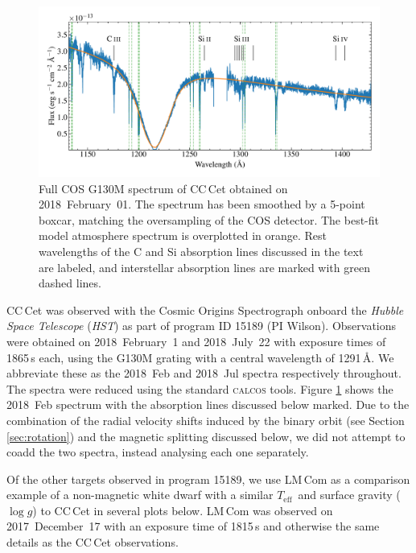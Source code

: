 \documentclass[fleqn,usenatbib]{mnras}
\newcommand{\Teff}{\mbox{$T_{\mathrm{eff}}$}}
\newcommand{\logg}{\mbox{$\log g$}}
\begin{document}
\begin{figure}
    \centering
    \includegraphics[width=2\columnwidth]{cc_cet_cos.pdf}
    \caption{Full COS G130M spectrum of CC\,Cet obtained on 2018~February~01. The spectrum has been smoothed by a 5-point boxcar, matching the 
    oversampling 
    of the COS detector. The best-fit model atmosphere spectrum is overplotted in orange. Rest wavelengths of the C and Si absorption lines discussed in the text are labeled, and interstellar absorption lines are marked with green dashed lines.}
    \label{fig:cos_spec}
\end{figure}

CC\,Cet was observed with the Cosmic Origins Spectrograph \citep[COS,][]{greenetal12-1} onboard the \textit{Hubble Space Telescope} (\textit{HST}) as part of program ID 15189 (PI Wilson). Observations were obtained on 2018~February~1 and 2018~July~22 with exposure times of 1865\,s each, using the G130M grating with a central wavelength of 1291\,\AA. We abbreviate these as the 2018~Feb and 2018~Jul spectra respectively throughout. The spectra were reduced using the standard \textsc{calcos} tools. Figure \ref{fig:cos_spec} shows the 2018~Feb spectrum with the absorption lines discussed below marked. Due to the combination of the radial velocity shifts induced by the binary orbit (see Section \ref{sec:rotation}) and the magnetic splitting discussed below, we did not attempt to coadd the two spectra, instead analysing each one separately. 

Of the other targets observed in program 15189, we use LM\,Com as a comparison example of a non-magnetic white dwarf with a similar \Teff\ and surface gravity (\logg) to CC\,Cet in several plots below. LM\,Com was observed on 2017~December~17 with an exposure time of 1815\,s and otherwise the same details as the CC\,Cet observations. 
\end{document}
